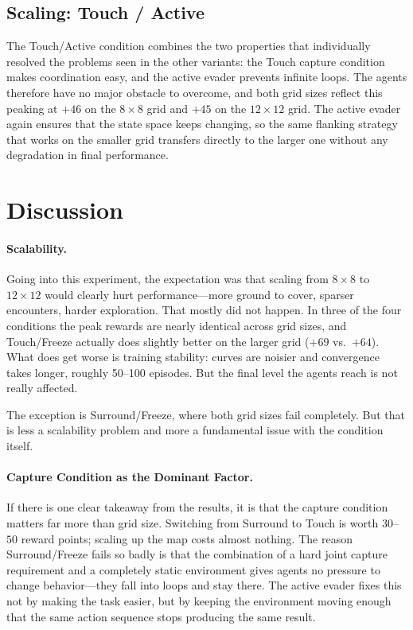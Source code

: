 \documentclass[sigconf,screen]{acmart}
\begin{document}
\subsection{Scaling: Touch / Active}

The Touch/Active condition combines the two properties that individually resolved the problems seen in the other variants: the Touch capture condition makes coordination easy, and the active evader prevents infinite loops. The agents therefore have no major obstacle to overcome, and both grid sizes reflect this peaking at $+46$ on the $8{\times}8$ grid and $+45$ on the $12{\times}12$ grid. The active evader again ensures that the state space keeps changing, so the same flanking strategy that works on the smaller grid transfers directly to the larger one without any degradation in final performance.


\section{Discussion}
\label{sec:discussion}

\paragraph{Scalability.}
Going into this experiment, the expectation was that scaling from $8{\times}8$ to $12{\times}12$ would clearly hurt performance---more ground to cover, sparser encounters, harder exploration. That mostly did not happen. In three of the four conditions the peak rewards are nearly identical across grid sizes, and Touch/Freeze actually does slightly better on the larger grid ($+69$ vs.\ $+64$). What does get worse is training stability: curves are noisier and convergence takes longer, roughly 50--100 episodes. But the final level the agents reach is not really affected.

The exception is Surround/Freeze, where both grid sizes fail completely. But that is less a scalability problem and more a fundamental issue with the condition itself.

\paragraph{Capture Condition as the Dominant Factor.}
If there is one clear takeaway from the results, it is that the capture condition matters far more than grid size. Switching from Surround to Touch is worth $30$--$50$ reward points; scaling up the map costs almost nothing. The reason Surround/Freeze fails so badly is that the combination of a hard joint capture requirement and a completely static environment gives agents no pressure to change behavior---they fall into loops and stay there. The active evader fixes this not by making the task easier, but by keeping the environment moving enough that the same action sequence stops producing the same result.
\end{document}

